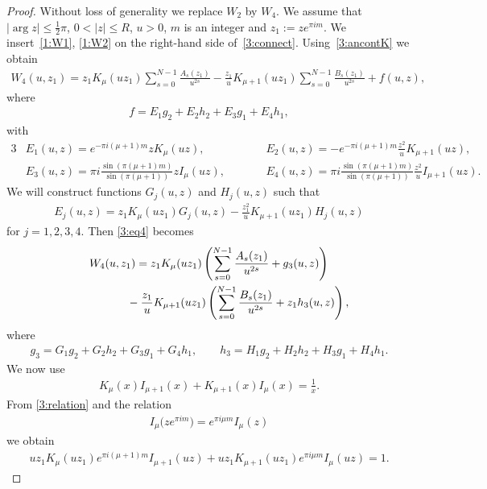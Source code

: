 \documentclass[pdftex]{sigma}
\numberwithin{equation}{section}
\begin{document}
\begin{proof}
Without loss of generality we replace $W_2$ by $W_4$. We assume that $|\arg z|\le \frac12\pi$, $0<|z|\le R$, $u>0$, $m$ is an integer and $z_1:=ze^{\pi im}$.
We insert~\eqref{1:W1}, \eqref{1:W2} on the right-hand side of~\eqref{3:connect}.
Using~\eqref{3:ancontK} we obtain
\begin{gather}\label{3:eq4}
W_4(u,z_1)=z_1K_\mu(uz_1)\sum_{s=0}^{N-1} \frac{A_s(z_1)}{u^{2s}}
-\frac{z_1}{u}K_{\mu+1}(uz_1)\sum_{s=0}^{N-1} \frac{B_s(z_1)}{u^{2s}}+f(u,z),
\end{gather}
where
\begin{gather*}%
 f=E_1g_2+E_2h_2+E_3g_1+E_4h_1,
\end{gather*}
with
\begin{alignat*}{3}
& E_1(u,z) = e^{-\pi i(\mu+1)m} zK_\mu(uz),\qquad &&
 E_2(u,z) = -e^{-\pi i (\mu+1)m}\frac{z^2}{u} K_{\mu+1}(uz),&\\
& E_3(u,z) = \pi i\frac{\sin(\pi(\mu+1)m)}{\sin(\pi(\mu+1))}z I_\mu(uz),\qquad&&
 E_4(u,z) = \pi i \frac{\sin(\pi (\mu+1)m)}{\sin(\pi (\mu+1))}\frac{z^2}{u}I_{\mu+1}(uz) .&
\end{alignat*}
We will construct functions $G_j(u,z)$ and $H_j(u,z)$ such that
\begin{gather*} E_j(u,z)=z_1 K_\mu(uz_1) G_j(u,z)-\frac{z_1^2}{u} K_{\mu+1}(uz_1) H_j(u,z)
\end{gather*}
for $j=1,2,3,4$.
Then \eqref{3:eq4} becomes
\begin{gather}
W_4(u,z_1)=z_1K_\mu(uz_1)\left(\sum_{s=0}^{N-1} \frac{A_s(z_1)}{u^{2s}}+g_3(u,z)\right)\nonumber\\
\hphantom{W_4(u,z_1)=}{}
-\frac{z_1}{u}K_{\mu+1}(uz_1)\left(\sum_{s=0}^{N-1} \frac{B_s(z_1)}{u^{2s}}+z_1h_3(u,z)\right),\label{4:eq5}
\end{gather}
where
\begin{gather*}
g_3 = G_1 g_2+G_2h_2+G_3 g_1+G_4 h_1,\qquad
h_3 = H_1 g_2+H_2h_2+H_3 g_1+H_4 h_1.
\end{gather*}
We now use \cite[(10.28.2)]{NIST}
\begin{gather}\label{3:relation}
 K_\mu(x)I_{\mu+1}(x)+K_{\mu+1}(x)I_\mu(x)=\frac1x .
\end{gather}
From \eqref{3:relation} and the relation
\begin{gather}\label{3:ancontI}
 I_\mu\big(ze^{\pi im}\big)=e^{\pi i\mu m}I_\mu(z)
\end{gather}
we obtain
\begin{gather*} u z_1K_\mu(uz_1) e^{\pi i (\mu+1)m} I_{\mu+1}(uz)+uz_1K_{\mu+1}(uz_1) e^{\pi i \mu m} I_\mu(uz)=1 .\end{gather*}

\end{proof}
\end{document}
